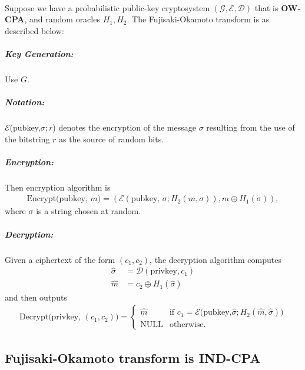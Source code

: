 \documentclass[letterpaper,12pt,oneside,onecolumn]{report}
\begin{document}
\paragraph{}
Suppose we have a probabilistic public-key cryptosystem $(\mathcal{G}, \mathcal{E}, \mathcal{D})$ that is \textbf{OW-CPA}, and random oracles $H_1, H_2$. The Fujisaki-Okamoto transform is as described below:
\subparagraph{Key Generation:}
Use $G$.
\subparagraph{Notation:}
$\mathcal{E}$(pubkey,$\sigma;r$) denotes the encryption of the message $\sigma$ resulting from the use of the bitstring $r$ as the source of random bits.
\subparagraph{Encryption:}
Then encryption algorithm is
\begin{align*}
\text{Encrypt(pubkey, }m) = (\mathcal{E}(\text{pubkey, }\sigma;H_2(m,\sigma)), m \oplus H_1(\sigma)),
\end{align*}
 where $\sigma$ is a string chosen at random.
 \subparagraph{Decryption:}
 Given a ciphertext of the form $(c_1,c_2)$, the decryption algorithm computes
 \begin{align*}
 \hat{\sigma} &= \mathcal{D}(\text{privkey},c_1) \\
 \hat{m} &= c_2 \oplus H_1(\hat{\sigma})
 \end{align*}
 and then outputs
 \begin{align*}
 \text{Decrypt(privkey, }(c_1,c_2)) = \begin{cases}
 \hat{m} &\text{if $c_1 = \mathcal{E}$(pubkey,$\hat{\sigma};H_2(\hat{m},\hat{\sigma}))$}\\
 \text{NULL} &\text{otherwise.}
 \end{cases}
 \end{align*}
 \subsection*{Fujisaki-Okamoto transform is IND-CPA}
\end{document}
